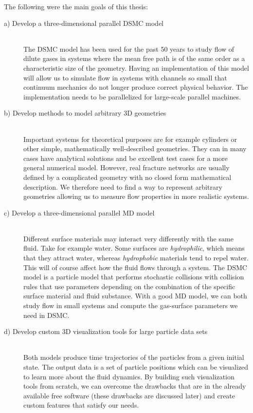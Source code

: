 The following were the main goals of this thesis:
\begin{description}
  \item[a) Develop a three-dimensional parallel DSMC model] \hfill \\
  The DSMC model has been used for the past 50 years to study flow of dilute gases in systems where the mean free path is of the same order as a characteristic size of the geometry. Having an implementation of this model will allow us to simulate flow in systems with channels so small that continuum mechanics do not longer produce correct physical behavior. The implementation needs to be parallelized for large-scale parallel machines.
  \item[b) Develop methods to model arbitrary 3D geometries] \hfill \\
  Important systems for theoretical purposes are for example cylinders or other simple, mathematically well-described geometries. They can in many cases have analytical solutions and be excellent test cases for a more general numerical model. However, real fracture networks are usually defined by a complicated geometry with no closed form mathematical description. We therefore need to find a way to represent arbitrary geometries allowing us to measure flow properties in more realistic systems.
  \item[c) Develop a three-dimensional parallel MD model] \hfill \\
  Different surface materials may interact very differently with the same fluid. Take for example water. Some surfaces are \textit{hydrophilic}, which means that they attract water, whereas \textit{hydrophobic} materials tend to repel water. This will of course affect how the fluid flows through a system. The DSMC model is a particle model that performs stochastic collisions with collision rules that use parameters depending on the combination of the specific surface material and fluid substance. With a good MD model, we can both study flow in small systems and compute the gas-surface parameters we need in DSMC. 
  \item[d) Develop custom 3D visualization tools for large particle data sets] \hfill \\
  Both models produce time trajectories of the particles from a given initial state. The output data is a set of particle positions which can be visualized to learn more about the fluid dynamics. By building such visualization tools from scratch, we can overcome the drawbacks that are in the already available free software (these drawbacks are discussed later) and create custom features that satisfy our needs. 

\end{description}

